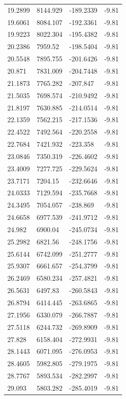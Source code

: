 \begin{table}[H]
\begin{tabular}{llll}
19.2899 & 8144.929 & -189.2339 & -9.81 \\
19.6061 & 8084.107 & -192.3361 & -9.81 \\
19.9223 & 8022.304 & -195.4382 & -9.81 \\
20.2386 & 7959.52 & -198.5404 & -9.81 \\
20.5548 & 7895.755 & -201.6426 & -9.81 \\
20.871 & 7831.009 & -204.7448 & -9.81 \\
21.1873 & 7765.282 & -207.847 & -9.81 \\
21.5035 & 7698.574 & -210.9492 & -9.81 \\
21.8197 & 7630.885 & -214.0514 & -9.81 \\
22.1359 & 7562.215 & -217.1536 & -9.81 \\
22.4522 & 7492.564 & -220.2558 & -9.81 \\
22.7684 & 7421.932 & -223.358 & -9.81 \\
23.0846 & 7350.319 & -226.4602 & -9.81 \\
23.4009 & 7277.725 & -229.5624 & -9.81 \\
23.7171 & 7204.15 & -232.6646 & -9.81 \\
24.0333 & 7129.594 & -235.7668 & -9.81 \\
24.3495 & 7054.057 & -238.869 & -9.81 \\
24.6658 & 6977.539 & -241.9712 & -9.81 \\
24.982 & 6900.04 & -245.0734 & -9.81 \\
25.2982 & 6821.56 & -248.1756 & -9.81 \\
25.6144 & 6742.099 & -251.2777 & -9.81 \\
25.9307 & 6661.657 & -254.3799 & -9.81 \\
26.2469 & 6580.234 & -257.4821 & -9.81 \\
26.5631 & 6497.83 & -260.5843 & -9.81 \\
26.8794 & 6414.445 & -263.6865 & -9.81 \\
27.1956 & 6330.079 & -266.7887 & -9.81 \\
27.5118 & 6244.732 & -269.8909 & -9.81 \\
27.828 & 6158.404 & -272.9931 & -9.81 \\
28.1443 & 6071.095 & -276.0953 & -9.81 \\
28.4605 & 5982.805 & -279.1975 & -9.81 \\
28.7767 & 5893.534 & -282.2997 & -9.81 \\
29.093 & 5803.282 & -285.4019 & -9.81 \\

\end{tabular}
\end{table}
